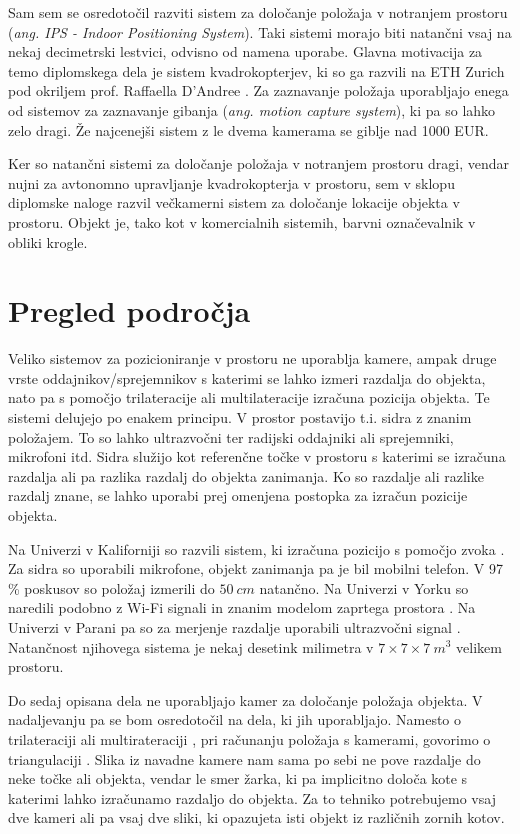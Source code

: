 \documentclass[a4paper, 12pt]{book}
\begin{document}
Sam sem se osredotočil razviti sistem za določanje položaja v notranjem prostoru (\emph{ang. IPS - Indoor Positioning System}). Taki sistemi morajo biti natančni vsaj na nekaj decimetrski lestvici, odvisno od namena uporabe. Glavna motivacija za temo diplomskega dela je sistem kvadrokopterjev, ki so ga razvili na ETH Zurich pod okriljem prof. Raffaella D’Andree \cite{fma}. Za zaznavanje položaja uporabljajo enega od sistemov za zaznavanje gibanja (\emph{ang. motion capture system}), ki pa so lahko zelo dragi. Že najcenejši sistem z le dvema kamerama se giblje nad 1000 EUR. 

Ker so natančni sistemi za določanje položaja v notranjem prostoru dragi, vendar nujni za avtonomno upravljanje kvadrokopterja v prostoru, sem v sklopu diplomske naloge razvil večkamerni sistem za določanje lokacije objekta v prostoru. Objekt je, tako kot v komercialnih sistemih, barvni označevalnik v obliki krogle. 

\section{Pregled področja}
Veliko sistemov za pozicioniranje v prostoru ne uporablja kamere, ampak druge vrste oddajnikov/sprejemnikov s katerimi se lahko izmeri razdalja do objekta, nato pa s pomočjo trilateracije \cite{wiki:trilateration} ali multilateracije \cite{wiki:multilateration} izračuna pozicija objekta. Te sistemi delujejo po enakem principu. V prostor postavijo t.i. sidra z znanim položajem. To so lahko ultrazvočni ter radijski oddajniki ali sprejemniki, mikrofoni itd. Sidra služijo kot referenčne točke v prostoru s katerimi se izračuna razdalja ali pa razlika razdalj do objekta zanimanja. Ko so razdalje ali razlike razdalj znane, se lahko uporabi prej omenjena postopka za izračun pozicije objekta.

Na Univerzi v Kaliforniji so razvili sistem, ki izračuna pozicijo s pomočjo zvoka \cite{mandal2005beep}. Za sidra so uporabili mikrofone, objekt zanimanja pa je bil mobilni telefon. V 97 \% poskusov so položaj izmerili do $50 \ cm$ natančno. Na Univerzi v Yorku so naredili podobno z Wi-Fi signali in znanim modelom zaprtega prostora \cite{chan2013dynamic}. Na Univerzi v Parani pa so za merjenje razdalje uporabili ultrazvočni signal \cite{auer20033d}. Natančnost njihovega sistema je nekaj desetink milimetra v $7\times7\times7 \ m^3$ velikem prostoru.

Do sedaj opisana dela ne uporabljajo kamer za določanje položaja objekta. V nadaljevanju pa se bom osredotočil na dela, ki jih uporabljajo. Namesto o trilateraciji \cite{wiki:trilateration} ali multirateraciji \cite{wiki:multilateration}, pri računanju položaja s kamerami, govorimo o triangulaciji \cite{wiki:triangulation}. Slika iz navadne kamere nam sama po sebi ne pove razdalje do neke točke ali objekta, vendar le smer žarka, ki pa implicitno določa kote s katerimi lahko izračunamo razdaljo do objekta. Za to tehniko potrebujemo vsaj dve kameri ali pa vsaj dve sliki, ki opazujeta isti objekt iz različnih zornih kotov.
\end{document}
